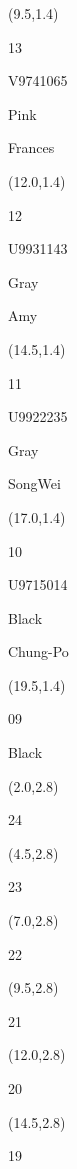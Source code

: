 \documentclass[a4paper]{article}
\newcommand{\myseat}[5]{%
\vspace{-0.1cm} \hspace{-0.5cm}
\parbox[t][2.2cm][t]{3.5cm}{%
\small #1 %
\begin{description}
\vspace{-0.1cm}
\item [ID:] #2
\vspace{-0.1cm}
\item [Team:] #3 \normalsize
\vspace{-0.1cm}
\item \normalsize #4 #5
\vspace{-0.1cm}
\end{description}
}
}
\begin{document}
\begin{CJK}{UTF8}{cyberbit}
\begin{textblock}{2.5}(9.5,1.4)
\myseat{13}{V9741065}{Pink}{Frances}{}
\end{textblock}

\begin{textblock}{2.5}(12.0,1.4)
\myseat{12}{U9931143}{Gray}{Amy}{}
\end{textblock}

\begin{textblock}{2.5}(14.5,1.4)
\myseat{11}{U9922235}{Gray}{SongWei}{}
\end{textblock}

\begin{textblock}{2.5}(17.0,1.4)
\myseat{10}{U9715014}{Black}{Chung-Po}{}
\end{textblock}

\begin{textblock}{2.5}(19.5,1.4)
\myseat{09}{}{Black}{}{}
\end{textblock}


\begin{textblock}{2.5}(2.0,2.8)
\textblockcolor{}
\myseat{24}{}{}{}{}
\end{textblock}

\begin{textblock}{2.5}(4.5,2.8)
\textblockcolor{}
\myseat{23}{}{}{}{}
\end{textblock}

\begin{textblock}{2.5}(7.0,2.8)
\textblockcolor{}
\myseat{22}{}{}{}{}
\end{textblock}

\begin{textblock}{2.5}(9.5,2.8)
\textblockcolor{}
\myseat{21}{}{}{}{}
\end{textblock}

\begin{textblock}{2.5}(12.0,2.8)
\textblockcolor{}
\myseat{20}{}{}{}{}
\end{textblock}

\begin{textblock}{2.5}(14.5,2.8)
\textblockcolor{}
\myseat{19}{}{}{}{}
\end{textblock}


\end{CJK}
\end{document}
